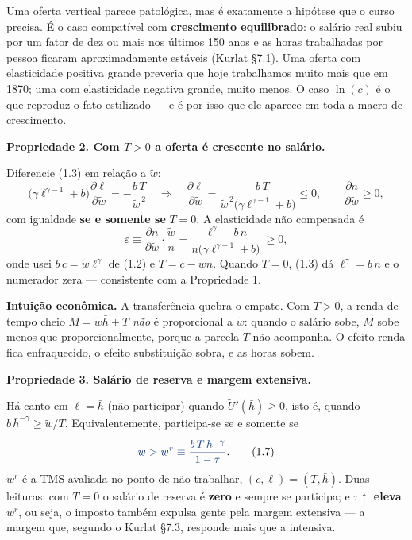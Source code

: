 \documentclass[11pt, a4paper]{article}
\newcommand{\passo}[1]{\medskip\noindent\textbf{#1}\par\nobreak}
\newcommand{\intuicao}[1]{%
  \medskip\noindent\textcolor{midblue}{\textbf{Intuição econômica.}} #1\par}
\newcommand{\resp}[1]{%
  \ifmmode {\color{darkblue}#1}\else\textcolor{darkblue}{\textbf{#1}}\fi}
\newcommand{\wt}{\widetilde{w}}
\begin{document}
\begin{tcolorbox}[trapbox, title={Por que essa propriedade não é um defeito do modelo}]
\small
Uma oferta vertical parece patológica, mas é exatamente a hipótese que o curso precisa. É
o caso compatível com \textbf{crescimento equilibrado}: o salário real subiu por um fator
de dez ou mais nos últimos 150 anos e as horas trabalhadas por pessoa ficaram
aproximadamente estáveis (Kurlat §7.1). Uma oferta com elasticidade positiva grande
preveria que hoje trabalhamos muito mais que em 1870; uma com elasticidade negativa
grande, muito menos. O caso $\ln(c)$ é o que reproduz o fato estilizado --- e é por isso
que ele aparece em toda a macro de crescimento.
\end{tcolorbox}

\passo{Propriedade 2. Com $T>0$ a oferta é crescente no salário.}
Diferencie (1.3) em relação a $\wt$:
\[
\big(\gamma\ell^{\gamma-1}+b\big)\frac{\partial \ell}{\partial \wt}
= -\frac{b\,T}{\wt^{\,2}}
\quad\Longrightarrow\quad
\frac{\partial \ell}{\partial \wt} = \frac{-b\,T}{\wt^{\,2}\big(\gamma\ell^{\gamma-1}+b\big)} \le 0,
\qquad
\frac{\partial n}{\partial \wt} \ge 0 ,
\tag{1.5}
\]
com igualdade \textbf{se e somente se} $T=0$. A elasticidade não compensada é
\[
\varepsilon \equiv \frac{\partial n}{\partial \wt}\cdot\frac{\wt}{n}
= \frac{\ell^{\gamma} - b\,n}{n\big(\gamma\ell^{\gamma-1}+b\big)} \ \ge 0,
\tag{1.6}
\]
onde usei $b\,c = \wt \ell^{\gamma}$ de (1.2) e $T = c - \wt n$. Quando $T=0$, (1.3) dá
$\ell^{\gamma} = b\,n$ e o numerador zera --- consistente com a Propriedade 1.

\intuicao{A transferência quebra o empate. Com $T>0$, a renda de tempo cheio
$M = \wt\bar h + T$ \emph{não} é proporcional a $\wt$: quando o salário sobe, $M$ sobe
menos que proporcionalmente, porque a parcela $T$ não acompanha. O efeito renda fica
enfraquecido, o efeito substituição sobra, e as horas sobem.}

\passo{Propriedade 3. Salário de reserva e margem extensiva.}
Há canto em $\ell = \bar h$ (não participar) quando $\widetilde U'(\bar h) \ge 0$, isto é,
quando $b\,\bar h^{-\gamma} \ge \wt/T$. Equivalentemente, participa-se se e somente se
\[
\resp{w > w^{r} \equiv \frac{b\,T\,\bar h^{-\gamma}}{1-\tau}} .
\tag{1.7}
\]
$w^r$ é a TMS avaliada no ponto de não trabalhar, $(c,\ell) = (T,\bar h)$. Duas leituras:
com $T=0$ o salário de reserva é \textbf{zero} e sempre se participa; e $\tau\uparrow$
\textbf{eleva} $w^r$, ou seja, o imposto também expulsa gente pela margem extensiva --- a
margem que, segundo o Kurlat §7.3, responde mais que a intensiva.
\end{document}
